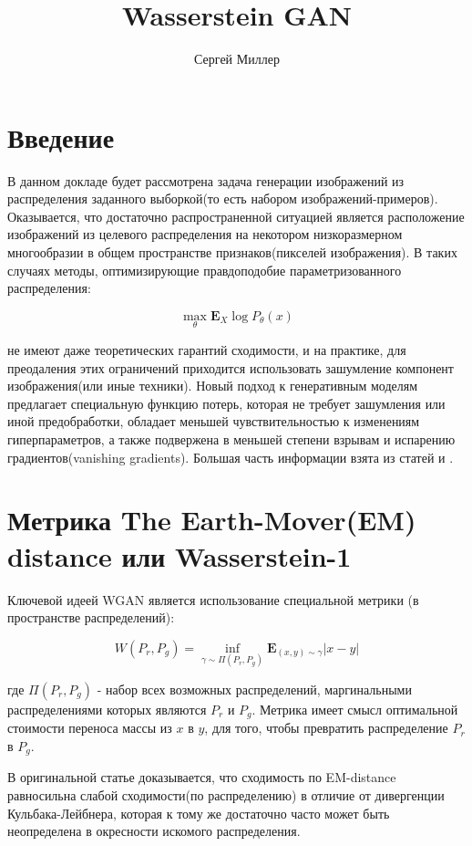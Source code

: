 \documentclass{article}
\title{Wasserstein GAN}
\author{Сергей Миллер}
\begin{document}
\maketitle

\tableofcontents{}

\section{Введение}

В данном докладе будет рассмотрена задача генерации изображений из распределения заданного выборкой(то есть набором изображений-примеров). Оказывается, что достаточно распространенной ситуацией является расположение изображений из целевого распределения на некотором низкоразмерном многообразии в общем пространстве признаков(пикселей изображения). В таких случаях методы, оптимизирующие правдоподобие параметризованного распределения:

$$ \max_{\theta} \mathbf{E}_X \log P_{\theta}(x)$$

не имеют даже теоретических гарантий сходимости, и на практике, для преодаления этих ограничений приходится использовать зашумление компонент изображения(или иные техники). Новый подход к генеративным моделям предлагает специальную функцию потерь, которая не требует зашумления или иной предобработки, обладает меньшей чувствительностью к изменениям гиперпараметров, а также подвержена в меньшей степени взрывам и испарению градиентов(vanishing gradients).
Большая часть информации взята из статей \cite{wgan} и \cite{wgan-improvement}.

\section{Метрика The Earth-Mover(EM) distance или Wasserstein-1}

Ключевой идеей WGAN является использование специальной метрики (в пространстве распределений):

$$W(P_{r}, P_{g}) = \inf_{\gamma \sim \Pi(P_{r}, P_{g})} \mathbf{E}_{(x,y) \sim \gamma} |x - y|$$

где $\Pi(P_{r}, P_{g})$ - набор всех возможных распределений, маргинальными распределениями которых являются $P_{r}$ и $P_{g}$. Метрика имеет смысл оптимальной стоимости переноса массы из $x$ в $y$, для того, чтобы превратить распределение $P_{r}$ в $P_{g}$.

В оригинальной статье \cite{wgan} доказывается, что сходимость по EM-distance равносильна слабой сходимости(по распределению) в отличие от дивергенции Кульбака-Лейбнера, которая к тому же достаточно часто может быть неопределена в окресности искомого распределения.
\end{document}
